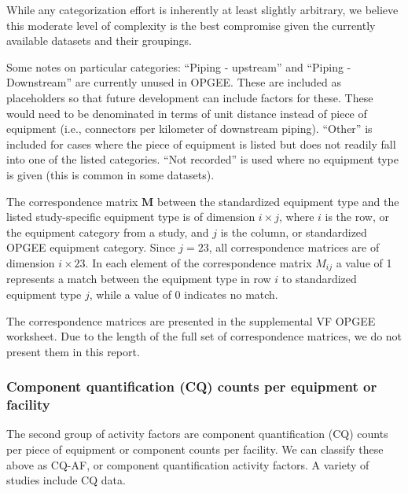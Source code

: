 \documentclass[11pt]{report}
\begin{document}
While any categorization effort is inherently at least slightly arbitrary, we believe this moderate level of complexity is the best compromise given the currently available datasets and their groupings.  

Some notes on particular categories: ``Piping - upstream'' and ``Piping - Downstream'' are currently unused in OPGEE. These are included as placeholders so that future development can include factors for these. These would need to be denominated in terms of unit distance instead of piece of equipment (i.e., connectors per kilometer of downstream piping).  ``Other'' is included for cases where the piece of equipment is listed but does not readily fall into one of the listed categories.  ``Not recorded'' is used where no equipment type is given (this is common in some datasets).

The correspondence matrix $\textbf{M}$ between the standardized equipment type and the listed study-specific equipment type is of dimension $i \times j$, where $i$ is the row, or the equipment category from a study, and $j$ is the column, or standardized OPGEE equipment category. Since $j = 23$, all correspondence matrices are of dimension $i \times 23$.  In each element of the correspondence matrix $M_{ij}$ a value of 1 represents a match between the equipment type in row $i$ to standardized equipment type $j$, while a value of 0 indicates no match.

The correspondence matrices are presented in the supplemental VF OPGEE worksheet. Due to the length of the full set of correspondence matrices, we do not present them in this report.


\subsubsection{Component quantification (CQ) counts per equipment or facility}

The second group of activity factors are component quantification (CQ) counts per piece of equipment or component counts per facility. We can classify these above as CQ-AF, or component quantification activity factors. A variety of studies include CQ data.  
\end{document}
